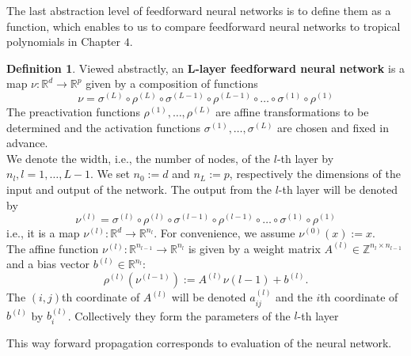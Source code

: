 \documentclass{article}
\theoremstyle{definition}
\newtheorem{definition}[theorem]{Definition}
\begin{document}
The last abstraction level of feedforward neural networks is to define them as a function, which enables to us to compare feedforward neural networks to tropical polynomials in Chapter $4$.

\begin{definition}\hspace{1sp}\cite{zhang2018tropical}\label{def:nur_net_fkt}
Viewed abstractly, an \textbf{L-layer feedforward neural network} is a map $\nu : \mathbb{R}^{d} \to \mathbb{R}^{p}$ given by a composition of functions
$$ \nu = \sigma^{(L)} \circ \rho^{(L)} \circ \sigma^{(L-1)} \circ \rho^{(L-1)} \circ \dots \circ \sigma^{(1)} \circ \rho^{(1)}$$
The preactivation functions $\rho^{(1)}, \dots , \rho^{(L)}$ are affine transformations to be determined and the activation functions $\sigma^{(1)}, \dots , \sigma^{(L)}$ are chosen and fixed in advance. \\
We denote the width, i.e., the number of nodes, of the $l$-th
layer by $n_l, l = 1, \dots , L-1$. We set $n_0 := d$ and $n_L := p$, respectively the dimensions of the input and output of the network. The output from the $l$-th layer will be denoted by
$$\nu^{(l)} = \sigma^{(l)} \circ \rho^{(l)} \circ \sigma^{(l-1)} \circ \rho^{(l-1)} \circ \dots \circ \sigma^{(1)} \circ \rho^{(1)}$$
i.e., it is a map $\nu^{(l)} : \mathbb{R}^{d} \to \mathbb{R}^{n_l}$. For convenience, we assume $\nu^{(0)}(x) := x$. \\
The affine function $\nu^{(l)} : \mathbb{R}^{n_{l-1}} \to \mathbb{R}^{n_{l}}$ is given by a weight matrix $A^{(l)} \in \mathbb{Z}^{n_l \times n_{l-1}} $ and a bias vector $b^{(l)} \in \mathbb{R}^{n_l}$:
$$ \rho^{(l)}(\nu^{(l-1)}) := A^{(l)} \nu{(l-1)} + b^{(l)}. $$
The $(i, j)$th coordinate of $A^{(l)}$ will be denoted $a^{(l)}_{ij}$ and the $i$th coordinate of $b^{(l)}$ by $b^{(l)}_{i}$. Collectively they form the parameters of the $l$-th layer
\end{definition}

This way forward propagation corresponds to evaluation of the neural network.
\end{document}
